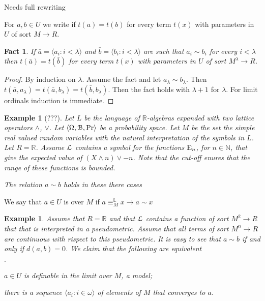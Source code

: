 \documentclass[11pt,oneside]{amsart}
\newcommand{\mylabel}[1]{{#1}\hfill}
\renewenvironment{itemize}
  {\begin{list}{$\cdot$}{%
   \setlength{\parskip}{0mm}
   \setlength{\topsep}{.2\baselineskip}
   \setlength{\rightmargin}{0mm}
   \setlength{\listparindent}{0mm}
   \setlength{\itemindent}{0mm}
   \setlength{\labelwidth}{3ex}
   \setlength{\itemsep}{.2\baselineskip}
   \setlength{\parsep}{.2\baselineskip}
   \setlength{\partopsep}{0mm}
   \setlength{\labelsep}{1ex}
   \setlength{\leftmargin}{\labelwidth+\labelsep}
   \let\makelabel\mylabel}}{%
   \end{list}}
\theoremstyle{plain}
\newtheorem{fact}[theorem]{Fact}
\newtheorem{example}[theorem]{Example}
\theoremstyle{remark}
\renewcommand*{\emph}[1]{%
   \smash{\tikz[baseline]\node[rectangle, fill=olive!25, rounded corners, inner xsep=0.5ex, inner ysep=0.2ex, anchor=base, minimum height = 2.7ex]{#1};}}
\begin{document}
Needs full rewriting

For $a,b\in U$ we write \emph{$a\sim b$\/} if $t(a)=t(b)$ for every term $t(x)$ with parameters in $U$ of sort $M\to R$. 

\begin{fact}
  If $\bar a=\langle a_i:i<\lambda\rangle$ and $\bar b=\langle b_i:i<\lambda\rangle$ are such that $a_i\sim b_i$ for every $i<\lambda$ then $t(\bar a)=t(\bar b)$ for every term $t(x)$ with parameters in $U$ of sort $M^\lambda\to R$.
\end{fact}

\begin{proof}
  By induction on $\lambda$. Assume the fact and let $a_\lambda\sim b_\lambda$.
  Then $t(\bar a,a_\lambda)=t(\bar a,b_\lambda)=t(\bar b,b_\lambda)$.
  Then the fact holds with $\lambda+1$ for $\lambda$.
  For limit ordinals induction is immediate.
\end{proof}

\begin{example}[???]
  Let $L$ be the language of $\mathds{R}$-algebras expanded with two lattice operators $\wedge$, $\vee$.
  Let $\langle\Omega,{\EuScript B},\Pr\rangle$ be a probability space.
  Let $M$ be the set the simple real valued random variables with the natural interpretation of the symbols in $L$. 
  Let $R=\mathds{R}$.
  Assume ${\EuScript L}$ contains a symbol for the functions ${\rm E}_n$, for $n\in\mathds{N}$, that give the expected value of $(X\wedge n)\vee -n$.
  Note that the cut-off enures that the range of these functions is bounded.

  The relation $a\sim b$ holds in these there cases


\end{example}



We say that $a\in U$ is \emph{definable in the limit\/} over $M$ if $a\equiv^\mathds{L}_M x\rightarrow a\sim x$

\begin{example}
  Assume that $R=\mathds{R}$ and that ${\EuScript L}$ contains a function of sort $M^2\to R$ that that is interpreted in a pseudometric.
  Assume that all terms of sort $M^n\to R$ are continuous with rispect to this pseudometric.
  It is easy to see that $a\sim b$ if and only if $d(a,b)=0$.
  We claim that the following are equivalent
  \begin{itemize}
    \item[1.] $a\in U$ is definable in the limit over $M$, a model;
    \item[2.] there is a sequence $\langle a_i: i\in\omega\rangle$ of elements of $M$ that converges to $a$.
  \end{itemize} 
\end{example}
\end{document}
